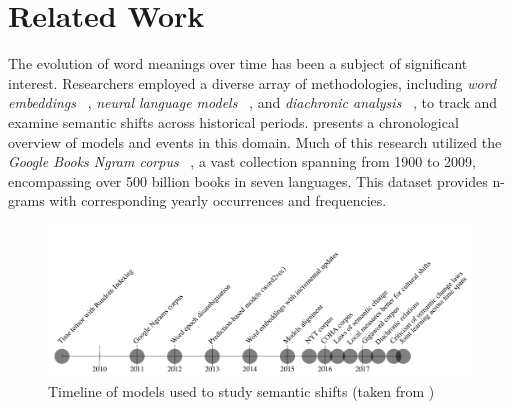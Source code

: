 
\section{Related Work} \label{sec:relatedwork}
The evolution of word meanings over time has been a subject of significant interest.
Researchers employed a diverse array of methodologies, including \emph{word embeddings} ~\cite{kulkarni2014statisticallysignificantdetectionlinguistic},
\emph{neural language models} ~\cite{kim-etal-2014-temporal}, and \emph{diachronic analysis} ~\cite{hamilton-etal-2016-diachronic, kutuzov-etal-2018-diachronic},
to track and examine semantic shifts across historical periods.
 presents a chronological overview of models and events in this domain.
Much of this research utilized the \emph{Google Books Ngram corpus}
~\cite{gulordava-baroni-2011-distributional, kim-etal-2014-temporal, kulkarni2014statisticallysignificantdetectionlinguistic, 10.1007/978-3-319-50496-4_18, hamilton-etal-2016-cultural, hamilton-etal-2016-diachronic, kutuzov-etal-2018-diachronic},
a vast collection spanning from 1900 to 2009,
encompassing over 500 billion books in seven languages.
This dataset provides n-grams with corresponding yearly occurrences and frequencies.

\begin{figure}[tbh]
\vspace{-1em}
\centering
\includegraphics[scale=0.45]{figures/survey}
\caption{Timeline of models used to study semantic shifts (taken from \cite{kutuzov-etal-2018-diachronic})}\label{fig:timeline}
\end{figure}

